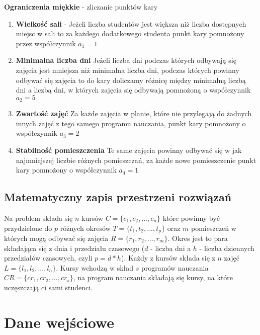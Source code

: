 \textbf{Ograniczenia miękkie} - zliczanie punktów kary
\begin{enumerate}
\item \textbf{Wielkość sali} - Jeżeli liczba studentów jest większa niż liczba dostępnych miejsc w sali to za każdego dodatkowego studenta punkt kary pomnożony przez współczynnik ${a_{1} = 1}$ 
\item \textbf{Minimalna liczba dni}
Jeżeli liczba dni podczas których odbywają się zajęcia jest mniejsza niż minimalna liczba dni, podczas których powinny odbywać się zajęcia to do kary doliczamy różnicę między minimalną liczbą dni a liczbą dni, w których zajęcia się odbywają pomnożoną o współczynnik $a_{2} = 5$ 
\item \textbf{Zwartość zajęć}
Za każde zajęcia w planie, które nie przylegają do żadnych innych zajęć z tego samego programu nauczania, punkt kary pomnożony o współczynnik ${a_{3} = 2}$
\item \textbf{Stabilność pomieszczenia}
Te same zajęcia powinny odbywać się w jak najmniejszej liczbie różnych pomieszczań, za każde nowe pomieszczenie punkt kary pomnożony o współczynnik ${a_{4} = 1}$
\end{enumerate}

\subsection{Matematyczny zapis przestrzeni rozwiązań} \cite{tabu}
\par Na problem składa się ${n}$ kursów ${C = \{c_{1}, c_{2},...,c_{n}\}}$ które powinny być przydzielone do ${p}$ różnych okresów ${T = \{t_{1}, t_{2},...,t_{p}\}}$ oraz ${m}$ pomieszczeń w których mogą odbywać się zajęcia ${R = \{r_{1}, r_{2},...,r_{m}\}}$. Okres jest to para składająca się z dnia i przedziału czasowego (${d}$ - liczba dni a ${h}$ - liczba dziennych przedziałów czasowych, czyli ${p = d * h}$). Każdy z kursów składa się z ${n}$ zajęć ${L = \{l_{1},l_{2},...,l_{n}\}}$. Kursy wchodzą w skład ${s}$ programów nauczania ${CR = \{cr_{1}, cr_{2}, ..., cr_{s}\}}$, na program nauczania składają się kursy, na które uczęszczają ci sami studenci. 

\section{Dane wejściowe}
\label{sec:input_format}
